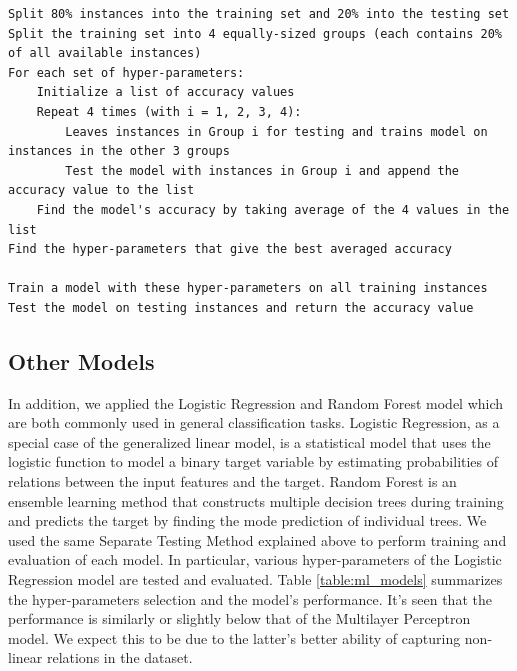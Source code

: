 \documentclass[letterpaper,twocolumn,10pt]{article}
\begin{document}
\begin{lstlisting}[basicstyle=\scriptsize, float=*, label={lst:separate-testing}, caption={Pseudocode for the Separate Testing Procedure}]
Split 80% instances into the training set and 20% into the testing set
Split the training set into 4 equally-sized groups (each contains 20% of all available instances)
For each set of hyper-parameters:
    Initialize a list of accuracy values
    Repeat 4 times (with i = 1, 2, 3, 4):
        Leaves instances in Group i for testing and trains model on instances in the other 3 groups
        Test the model with instances in Group i and append the accuracy value to the list
    Find the model's accuracy by taking average of the 4 values in the list
Find the hyper-parameters that give the best averaged accuracy

Train a model with these hyper-parameters on all training instances
Test the model on testing instances and return the accuracy value
\end{lstlisting}

\subsection{Other Models}

In addition, we applied the Logistic Regression and Random Forest model which are both commonly used in general classification tasks. Logistic Regression, as a special case of the generalized linear model, is a statistical model that uses the logistic function to model a binary target variable by estimating probabilities of relations between the input features and the target. Random Forest is an ensemble learning method that constructs multiple decision trees during training and predicts the target by finding the mode prediction of individual trees. We used the same Separate Testing Method explained above to perform training and evaluation of each model. In particular, various hyper-parameters of the Logistic Regression model are tested and evaluated. Table \ref{table:ml_models} summarizes the hyper-parameters selection and the model's performance. It's seen that the performance is similarly or slightly below that of the Multilayer Perceptron model. We expect this to be due to the latter's better ability of capturing non-linear relations in the dataset.
\end{document}
